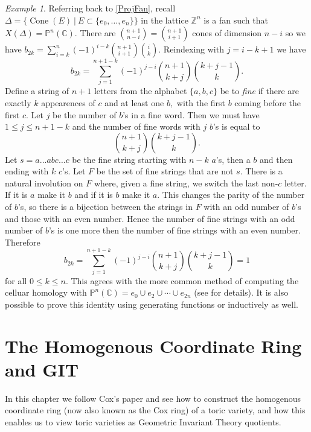 \documentclass[BSc]{usydthesis}
\numberwithin{equation}{chapter}
\theoremstyle{remark}
\newtheorem{Example}[equation]{Example}
\newcommand{\C}{\mathbb{C}}
\newcommand{\Z}{\mathbb{Z}}
\newcommand{\Proj}{\mathbb{P}}
\DeclareMathOperator{\Cone}{Cone}
\begin{document}
\begin{Example}
Referring back to \ref{ProjFan}, recall $\Delta = \{ \Cone(E) \ | \ E\subset \{e_0, \ldots, e_n\} \}$ in the lattice $\Z^n$ is a fan such that $X(\Delta) = \Proj^n(\C).$ There are $\displaystyle \binom{n+1}{n-i}=\binom{n+1}{i+1}$ cones of dimension $n-i$ so we have $\displaystyle b_{2k} = \sum_{i=k}^n (-1)^{i-k} \binom{n+1}{i+1}\binom{i}{k}.$ Reindexing with $j=i-k+1$ we have $$b_{2k} = \sum_{j=1}^{n+1-k} (-1)^{j-i} \binom{n+1}{k+j} \binom{k+j-1}{k}.$$ 
Define a string of $n+1$ letters from the alphabet $\{ a,b,c\}$ be to {\em fine} if there are exactly $k$ appearences of $c$ and at least one $b,$ with the first $b$ coming before the first $c.$ Let $j$ be the number of $b$'s in a fine word. Then we must have $1\leq j \leq n+1-k$ and the number of fine words with $j$ $b$'s is equal to $$ \binom{n+1}{k+j} \binom{k+j-1}{k}.$$
Let $s = a\ldots a b c\ldots c$ be the fine string starting with $n-k$ $a$'s, then a $b$ and then ending with $k$ $c$'s. Let $F$ be the set of fine strings that are not $s.$ There is a natural involution on $F$ where, given a fine string, we switch the last non-$c$ letter. If it is $a$ make it $b$ and if it is $b$ make it $a.$ This changes the parity of the number of $b$'s, so there is a bijection between the strings in $F$ with an odd number of $b$'s and those with an even number. Hence the number of fine strings with an odd number of $b$'s is one more then the number of fine strings with an even number. Therefore $$b_{2k} = \sum_{j=1}^{n+1-k} (-1)^{j-i} \binom{n+1}{k+j} \binom{k+j-1}{k}=1$$ for all $0 \leq k \leq n.$ This agrees with the more common method of computing the celluar homology with $\Proj^n(\C) = e_0 \cup e_2 \cup \cdots \cup e_{2n}$ (see \cite[Page.~ 140]{Hatcher} for details). It is also possible to prove this identity using generating functions or inductively as well.
\end{Example}





\chapter{The Homogenous Coordinate Ring and GIT}

In this chapter we follow Cox's paper \cite{CoxR} and see how to construct the homogenous coordinate ring (now also known as the Cox ring) of a toric variety, and how this enables us to view toric varieties as Geometric Invariant Theory quotients.
\end{document}
